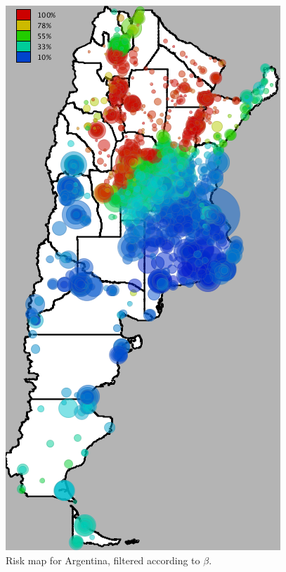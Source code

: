 \begin{figure}[h!]
	\caption{Risk map for Argentina, filtered according to $\beta$.}
	\label{fig:mapa_argentina}
	\begin{minipage}{.495\linewidth}
		\centering
		\includegraphics[width=0.90\linewidth]
		{figures/201112_hi_res_argentina_usuarios_proporcion_circulos_beta1/201112_hi_res_argentina_usuarios_proporcion_circulos_beta1}


\end{minipage}
\end{figure}
